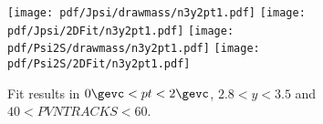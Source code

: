 \begin{figure}[H]
\begin{center}
\texttt{[image: pdf/Jpsi/drawmass/n3y2pt1.pdf]}
\texttt{[image: pdf/Jpsi/2DFit/n3y2pt1.pdf]}
\vspace*{-0.5cm}
\texttt{[image: pdf/Psi2S/drawmass/n3y2pt1.pdf]}
\texttt{[image: pdf/Psi2S/2DFit/n3y2pt1.pdf]}
\vspace*{-0.5cm}
\end{center}
\caption{Fit results in $0\gevc<pt<2\gevc$, $2.8<y<3.5$ and $40<PVNTRACKS<60$.}
\label{Fitn3y2pt1}
\end{figure}
